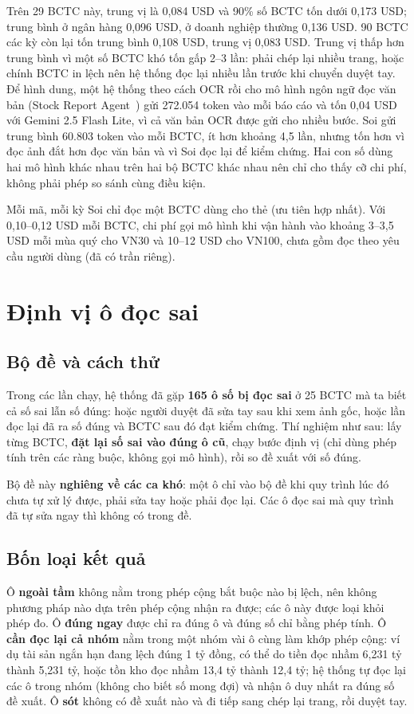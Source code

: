 \documentclass[12pt,a4paper]{report}
\begin{document}
Trên 29 BCTC này, trung vị là 0,084 USD và 90\% số BCTC tốn dưới 0,173 USD; trung bình ở ngân hàng 0,096 USD, ở doanh
nghiệp thường 0,136 USD. 90 BCTC các kỳ còn lại tốn trung bình 0,108 USD, trung vị 0,083 USD. Trung vị thấp hơn trung
bình vì một số BCTC khó tốn gấp 2--3 lần: phải chép lại nhiều trang, hoặc chính BCTC in lệch nên hệ thống đọc lại nhiều
lần trước khi chuyển duyệt tay. Để hình dung, một hệ thống theo cách OCR rồi cho mô hình ngôn ngữ đọc văn bản
(Stock Report Agent~\cite{prevcohort}) gửi 272.054 token vào mỗi báo cáo và tốn 0,04 USD với Gemini 2.5 Flash Lite, vì cả
văn bản OCR được gửi cho nhiều bước. Soi gửi trung bình 60.803 token vào mỗi BCTC, ít hơn khoảng 4,5 lần, nhưng tốn hơn vì
đọc ảnh đắt hơn đọc văn bản và vì Soi đọc lại để kiểm chứng. Hai con số dùng hai mô hình khác nhau trên hai bộ BCTC khác
nhau nên chỉ cho thấy cỡ chi phí, không phải phép so sánh cùng điều kiện.

Mỗi mã, mỗi kỳ Soi chỉ đọc một BCTC dùng cho thẻ (ưu tiên hợp nhất). Với 0,10--0,12 USD mỗi BCTC, chi phí gọi mô hình
khi vận hành vào khoảng 3--3,5 USD mỗi mùa quý cho VN30 và 10--12 USD cho VN100, chưa gồm đọc theo yêu cầu người dùng
(đã có trần riêng).

\section{Định vị ô đọc sai}\label{sec:evalrepair}
\subsection{Bộ đề và cách thử}
Trong các lần chạy, hệ thống đã gặp \textbf{165 ô số bị đọc sai} ở 25 BCTC mà ta biết cả số sai lẫn số đúng: hoặc người
duyệt đã sửa tay sau khi xem ảnh gốc, hoặc lần đọc lại đã ra số đúng và BCTC sau đó đạt kiểm chứng. Thí nghiệm như sau:
lấy từng BCTC, \textbf{đặt lại số sai vào đúng ô cũ}, chạy bước định vị (chỉ dùng phép tính trên các ràng buộc, không gọi
mô hình), rồi so đề xuất với số đúng.

Bộ đề này \textbf{nghiêng về các ca khó}: một ô chỉ vào bộ đề khi quy trình lúc đó chưa tự xử lý được, phải sửa tay hoặc
phải đọc lại. Các ô đọc sai mà quy trình đã tự sửa ngay thì không có trong đề.

\subsection{Bốn loại kết quả}
Ô \textbf{ngoài tầm} không nằm trong phép cộng bắt buộc nào bị lệch, nên không phương pháp nào dựa trên phép cộng nhận
ra được; các ô này được loại khỏi phép đo. Ô \textbf{đúng ngay} được chỉ ra đúng ô và đúng số chỉ bằng phép tính. Ô
\textbf{cần đọc lại cả nhóm} nằm trong một nhóm vài ô cùng làm khớp phép cộng: ví dụ tài sản ngắn hạn đang lệch đúng 1
tỷ đồng, có thể do tiền đọc nhầm 6,231 tỷ thành 5,231 tỷ, hoặc tồn kho đọc nhầm 13,4 tỷ thành 12,4 tỷ; hệ thống tự đọc
lại các ô trong nhóm (không cho biết số mong đợi) và nhận ô duy nhất ra đúng số đề xuất. Ô \textbf{sót} không có đề
xuất nào và đi tiếp sang chép lại trang, rồi duyệt tay.
\end{document}
